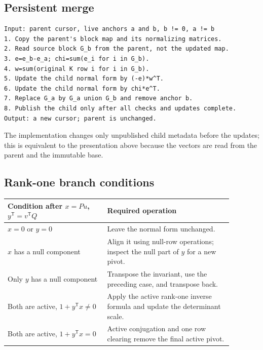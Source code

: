 \documentclass[11pt,letterpaper]{article}
\theoremstyle{definition}\newtheorem{definition}[theorem]{Definition}
\theoremstyle{remark}\newtheorem{remark}[theorem]{Remark}
\newcommand{\trans}{^{\mathsf T}}
\begin{document}
\subsection{Persistent merge}
\begin{lstlisting}
Input: parent cursor, live anchors a and b, b != 0, a != b
1. Copy the parent's block map and its normalizing matrices.
2. Read source block G_b from the parent, not the updated map.
3. e=e_b-e_a; chi=sum(e_i for i in G_b).
4. w=sum(original K row i for i in G_b).
5. Update the child normal form by (-e)*w^T.
6. Update the child normal form by chi*e^T.
7. Replace G_a by G_a union G_b and remove anchor b.
8. Publish the child only after all checks and updates complete.
Output: a new cursor; parent is unchanged.
\end{lstlisting}
The implementation changes only unpublished child metadata before the updates; this is equivalent to the presentation above because the vectors are read from the parent and the immutable base.

\subsection{Rank-one branch conditions}
\begin{center}
\begin{tabular}{p{0.39\linewidth}p{0.49\linewidth}}
\toprule
Condition after $x=Pu$, $y\trans=v\trans Q$ & Required operation\\
\midrule
$x=0$ or $y=0$ & Leave the normal form unchanged.\\
$x$ has a null component & Align it using null-row operations; inspect the null part of $y$ for a new pivot.\\
Only $y$ has a null component & Transpose the invariant, use the preceding case, and transpose back.\\
Both are active, $1+y\trans x\neq0$ & Apply the active rank-one inverse formula and update the determinant scale.\\
Both are active, $1+y\trans x=0$ & Active conjugation and one row clearing remove the final active pivot.\\
\bottomrule
\end{tabular}
\end{center}

\clearpage
\end{document}
